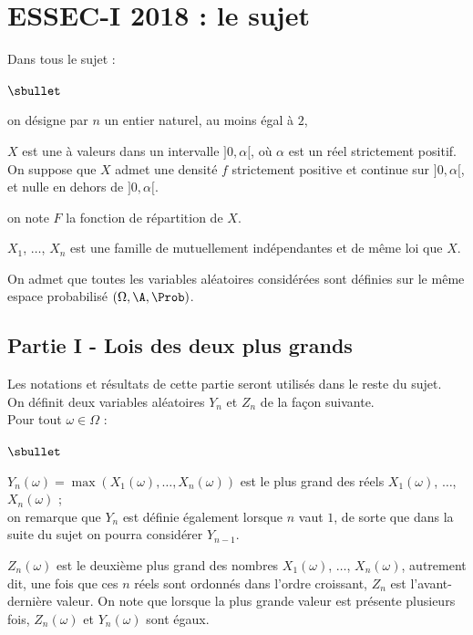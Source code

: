 \chapter*{ESSEC-I 2018 : le sujet}
  
%

\noindent
Dans tous le sujet :
\begin{noliste}{$\sbullet$}
\item on désigne par $n$ un entier naturel, au moins égal à $2$,
  
\item $X$ est une \var à valeurs dans un intervalle $]0,\alpha[$, où
  $\alpha$ est un réel strictement positif. On suppose que $X$ admet
  une densité $f$ strictement positive et continue sur $]0,\alpha[$,
  et nulle en dehors de $]0,\alpha[$.
  
\item on note $F$ la fonction de répartition de $X$.
  
\item $X_1$, $\ldots$, $X_n$ est une famille de \var mutuellement
  indépendantes et de même loi que $X$.
\end{noliste}
On admet que toutes les variables aléatoires considérées sont définies
sur le même espace probabilisé $(\Omega, \A, \Prob)$.


\section*{Partie I - Lois des deux plus grands}

\noindent
Les notations et résultats de cette partie seront utilisés dans le reste
du sujet.\\
On définit deux variables aléatoires $Y_n$ et $Z_n$ de la façon 
suivante.\\
Pour tout $\omega \in \Omega$ :
\begin{noliste}{$\sbullet$}
  \item $Y_n(\omega) = \max(X_1(\omega), \ldots, X_n(\omega))$ est le 
  plus grand des réels $X_1(\omega)$, $\ldots$, $X_n(\omega)$ ;\\
  on remarque que $Y_n$ est définie également lorsque $n$ vaut $1$, de 
  sorte que dans la suite du sujet on pourra considérer $Y_{n-1}$.
  
  \item $Z_n(\omega)$ est le \og deuxième plus grand \fg{} des nombres 
  $X_1(\omega)$, $\ldots$, $X_n(\omega)$, autrement dit, une fois que 
  ces $n$ réels sont ordonnés dans l'ordre croissant, $Z_n$ est 
  l'avant-dernière valeur. On note que lorsque la plus grande valeur 
  est présente plusieurs fois, $Z_n(\omega)$ et $Y_n(\omega)$ sont 
  égaux.
\end{noliste}

